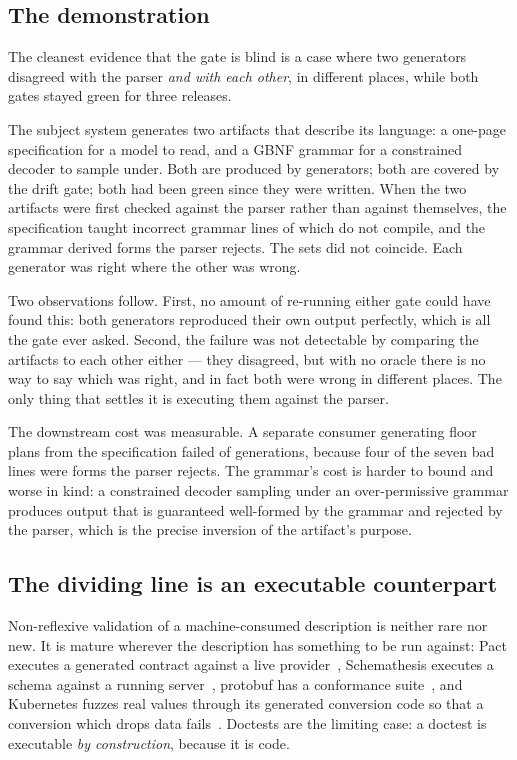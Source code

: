 \documentclass[10pt,journal,compsoc]{IEEEtran}
\begin{document}
\subsection{The demonstration}\label{sec:twogenerators}

The cleanest evidence that the gate is blind is a case where two generators disagreed
with the parser \emph{and with each other}, in different places, while both gates
stayed green for three releases.

The subject system generates two artifacts that describe its language: a one-page
specification for a model to read, and a GBNF grammar for a constrained decoder to
sample under. Both are produced by generators; both are covered by the drift gate; both
had been green since they were written. When the two artifacts were first checked
against the parser rather than against themselves, the specification taught
\factSpecBadLines{} incorrect grammar lines of which \factSpecUncompilable{} do not
compile, and the grammar derived \factGbnfIllegalForms{} forms the parser rejects. The
sets did not coincide. Each generator was right where the other was wrong.

Two observations follow. First, no amount of re-running either gate could have found
this: both generators reproduced their own output perfectly, which is all the gate ever
asked. Second, the failure was not detectable by comparing the artifacts to each other
either --- they disagreed, but with no oracle there is no way to say which was right,
and in fact both were wrong in different places. The only thing that settles it is
executing them against the parser.

The downstream cost was measurable. A separate consumer generating floor plans from the
specification failed \factDownstreamFailed{} of \factDownstreamTotal{} generations,
because four of the seven bad lines were forms the parser rejects. The grammar's cost
is harder to bound and worse in kind: a constrained decoder sampling under an
over-permissive grammar produces output that is guaranteed well-formed by the grammar
and rejected by the parser, which is the precise inversion of the artifact's purpose.

\subsection{The dividing line is an executable counterpart}

Non-reflexive validation of a machine-consumed description is neither rare nor new. It
is mature wherever the description has something to be run against: Pact executes a
generated contract against a live provider~\cite{pact_contract_testing}, Schemathesis
executes a schema against a running server~\cite{schemathesis}, protobuf has a
conformance suite~\cite{protobuf_conformance}, and Kubernetes fuzzes real values through
its generated conversion code so that a conversion which drops data
fails~\cite{k8s_roundtrip}. Doctests are the limiting case: a doctest is
executable \emph{by construction}, because it is code.
\end{document}

